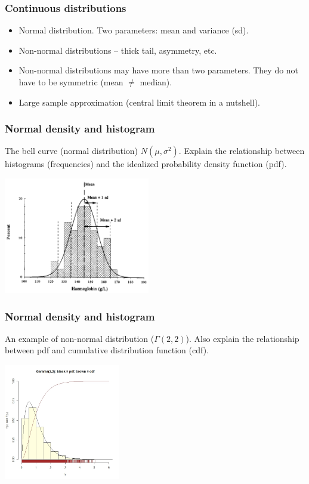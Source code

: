 \begin{frame}
  \frametitle{Continuous distributions}
  \begin{itemize}
  \item Normal distribution. Two parameters: mean and variance (sd).
  \item Non-normal distributions -- thick tail, asymmetry, etc.
  \item Non-normal distributions may have more than two parameters.
    They do not have to be symmetric (mean $\ne$ median).
  \item Large sample approximation (central limit theorem in a
    nutshell).
  \end{itemize}
\end{frame}

\begin{frame}[fragile]
  \frametitle{Normal density and histogram}
  The bell curve (normal distribution) $N(\mu, \sigma^{2})$. Explain
  the relationship between histograms (frequencies) and the idealized
  probability density function (pdf).
  \begin{center}
    \includegraphics[height=2.0in]{normal}
  \end{center}
\end{frame}

\begin{frame}[fragile]
  \frametitle{Normal density and histogram}
  An example of non-normal distribution ($\Gamma(2,2)$).  Also explain
  the relationship between pdf and cumulative distribution function
  (cdf).
  \begin{center}
    \includegraphics[height=2.0in]{gamma}
  \end{center}
\end{frame}

